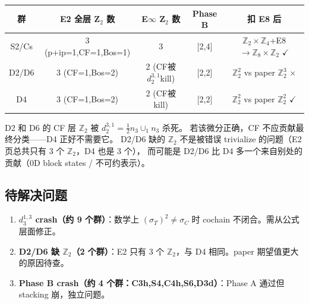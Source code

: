 \documentclass[a4paper,fontset=ubuntu,12pt]{ctexart}
\newcommand{\ZZ}{\mathbb{Z}}
\newcommand{\aT}{\sigma_T}
\newcommand{\aC}{\sigma_C}
\begin{document}
\begin{center}
\begin{tabular}{c|c|c|c|c}
\hline
群 & E2 全层 Z$_2$ 数 & E$\infty$ Z$_2$ 数 & Phase B & 扣 E8 后 \\
\hline
S2/Cs & 3 (p+ip=1,CF=1,Bos=1) & 3 & [2,4] & $\ZZ_2\times\ZZ_4$+E8$\to\ZZ_8\times\ZZ_2$ $\checkmark$ \\
D2/D6 & 3 (CF=1,Bos=2) & 2 (CF被$d_2^{3,1}$kill) & [2,2] & $\ZZ_2^2$ vs paper $\ZZ_2^3$ $\times$ \\
D4 & 3 (CF=1,Bos=2) & 2 (CF被kill) & [2,2] & $\ZZ_2^2$ vs paper $\ZZ_2^2$ $\checkmark$ \\
\hline
\end{tabular}
\end{center}

D2 和 D6 的 CF 层 $\ZZ_2$ 被 $d_2^{3,1}=\frac12 n_3\cup_1 n_3$ 杀死。
若该微分正确，CF 不应贡献最终分类——D4 正好不需要它。
D2/D6 缺的 $\ZZ_2$ 不是被错误 trivialize 的问题（E2 页总共只有 3 个 $\ZZ_2$，D4 也是 3 个），
而可能是 D2/D6 比 D4 多一个来自别处的贡献（0D block states / 不可约表示）。

\subsection{待解决问题}

\begin{enumerate}
\item \textbf{$d_3^{1,3}$ crash（约 9 个群）}：数学上 $(\aT)^2\neq\aC$ 时 cochain 不闭合。需从公式层面修正。
\item \textbf{D2/D6 缺 $\ZZ_2$（2 个群）}：E2 只有 3 个 $\ZZ_2$，与 D4 相同。paper 期望值更大的原因待查。
\item \textbf{Phase B crash（约 4 个群：C3h,S4,C4h,S6,D3d）}：Phase A 通过但 stacking 崩，独立问题。
\end{enumerate}
\end{document}
